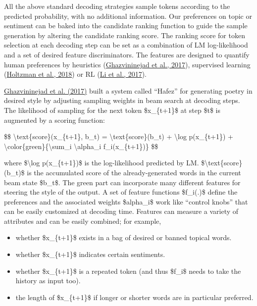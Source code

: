 All the above standard decoding strategies sample tokens according to the predicted probability, with no additional information. Our preferences on topic or sentiment can be baked into the candidate ranking function to guide the sample generation by altering the candidate ranking score. The ranking score for token selection at each decoding step can be set as a combination of LM log-likelihood and a set of desired feature discriminators. The features are designed to quantify human preferences by heuristics (\href{https://www.aclweb.org/anthology/P17-4008/}{Ghazvininejad et al., 2017}), supervised learning (\href{https://arxiv.org/abs/1805.06087}{Holtzman et al., 2018}) or RL (\href{https://arxiv.org/abs/1701.06549}{Li et al., 2017}).

\href{https://www.aclweb.org/anthology/P17-4008/}{Ghazvininejad et al. (2017)} built a system called ``Hafez'' for generating poetry in desired style by adjusting sampling weights in beam search at decoding steps. The likelihood of sampling for the next token \$x\_\{t+1\}\$ at step \$t\$ is augmented by a scoring function:

\$\$ \textbackslash text\{score\}(x\_\{t+1\}, b\_t) = \textbackslash text\{score\}(b\_t) + \textbackslash log p(x\_\{t+1\}) + \textbackslash color\{green\}\{\textbackslash sum\_i \textbackslash alpha\_i f\_i(x\_\{t+1\})\} \$\$

where \$\textbackslash log p(x\_\{t+1\})\$ is the log-likelihood predicted by LM. \$\textbackslash text\{score\}(b\_t)\$ is the accumulated score of the already-generated words in the current beam state \$b\_t\$. The green part can incorporate many different features for steering the style of the output. A set of feature functions \$f\_i(.)\$ define the preferences and the associated weights \$alpha\_i\$ work like ``control knobs'' that can be easily customized at decoding time. Features can measure a variety of attributes and can be easily combined; for example,

\begin{itemize}
\tightlist
\item
  whether \$x\_\{t+1\}\$ exists in a bag of desired or banned topical words.
\item
  whether \$x\_\{t+1\}\$ indicates certain sentiments.
\item
  whether \$x\_\{t+1\}\$ is a repeated token (and thus \$f\_i\$ needs to take the history as input too).
\item
  the length of \$x\_\{t+1\}\$ if longer or shorter words are in particular preferred.
\end{itemize}

